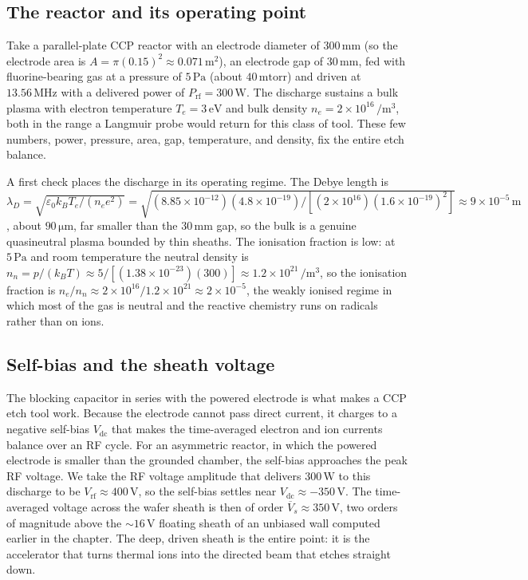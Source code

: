 

\subsection{The reactor and its operating point}

Take a parallel-plate CCP reactor with an electrode diameter of $300\,\si{
\milli\meter}$ (so the electrode area is $A = \pi(0.15)^{2} \approx
0.071\,\si{\meter\squared}$), an electrode gap of $30\,\si{\milli\meter}$,
fed with fluorine-bearing gas at a pressure of $5\,\si{\pascal}$ (about
$40\,\text{mtorr}$) and driven at $13.56\,\si{\mega\hertz}$ with a delivered
power of $P_{\mathrm{rf}} = 300\,\si{\watt}$. The discharge sustains a bulk
plasma with electron temperature $T_e = 3\,\si{\electronvolt}$ and bulk
density $n_e = 2\times 10^{16}\,\si{\per\meter\cubed}$, both in the range a
Langmuir probe would return for this class of tool. These few numbers,
power, pressure, area, gap, temperature, and density, fix the entire etch
balance.

A first check places the discharge in its operating regime. The Debye
length is $\lambda_D = \sqrt{\varepsilon_0 k_B T_e/(n_e e^{2})} =
\sqrt{(8.85\times 10^{-12})(4.8\times 10^{-19})/[(2\times 10^{16})(1.6
\times 10^{-19})^{2}]} \approx 9\times 10^{-5}\,\si{\meter}$, about
$90\,\si{\micro\meter}$, far smaller than the $30\,\si{\milli\meter}$ gap,
so the bulk is a genuine quasineutral plasma bounded by thin sheaths. The
ionisation fraction is low: at $5\,\si{\pascal}$ and room temperature the
neutral density is $n_n = p/(k_B T) \approx 5/[(1.38\times 10^{-23})(300)]
\approx 1.2\times 10^{21}\,\si{\per\meter\cubed}$, so the ionisation
fraction is $n_e/n_n \approx 2\times 10^{16}/1.2\times 10^{21} \approx
2\times 10^{-5}$, the weakly ionised regime in which most of the gas is
neutral and the reactive chemistry runs on radicals rather than on ions.

\subsection{Self-bias and the sheath voltage}

The blocking capacitor in series with the powered electrode is what makes a
CCP etch tool work. Because the electrode cannot pass direct current, it
charges to a negative self-bias $V_{\mathrm{dc}}$ that makes the
time-averaged electron and ion currents balance over an RF cycle. For an
asymmetric reactor, in which the powered electrode is smaller than the
grounded chamber, the self-bias approaches the peak RF voltage. We take the
RF voltage amplitude that delivers $300\,\si{\watt}$ to this discharge to be
$V_{\mathrm{rf}} \approx 400\,\si{\volt}$, so the self-bias settles near
$V_{\mathrm{dc}} \approx -350\,\si{\volt}$. The time-averaged voltage across
the wafer sheath is then of order $\overline{V}_s \approx 350\,\si{\volt}$,
two orders of magnitude above the $\sim 16\,\si{\volt}$ floating sheath of
an unbiased wall computed earlier in the chapter. The deep, driven sheath is
the entire point: it is the accelerator that turns thermal ions into the
directed beam that etches straight down.

